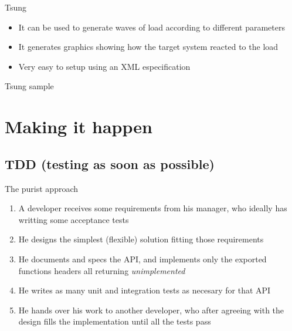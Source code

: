 \documentclass[pdf]{beamer}
\begin{document}
\begin{frame}{Tsung}
    \begin{itemize}
    \pause
    \item It can be used to generate waves of load according to different parameters
    \pause
    \item It generates graphics showing how the target system reacted to the load
    \pause
    \item Very easy to setup using an XML especification
    \end{itemize}
\end{frame}

\begin{frame}{Tsung sample}
\end{frame}

\section*{Making it happen}
\label{making_it_happen}

\subsection*{TDD (testing as soon as possible)}
\label{tdd}


\begin{frame}{The purist approach}
    \begin{enumerate}
    \item A developer receives some requirements from his manager, who ideally has writting some acceptance tests
    \pause
    \item He designs the simplest (flexible) solution fitting those requirements
    \pause
    \item He documents and specs the API, and implements only the exported functions headers all returning \emph{unimplemented}
    \pause
    \item He writes as many unit and integration tests as necesary for that API
    \pause
    \item He hands over his work to another developer, who after agreeing with the design fills the implementation until
    all the tests pass
    \end{enumerate}
\end{frame}
\end{document}
